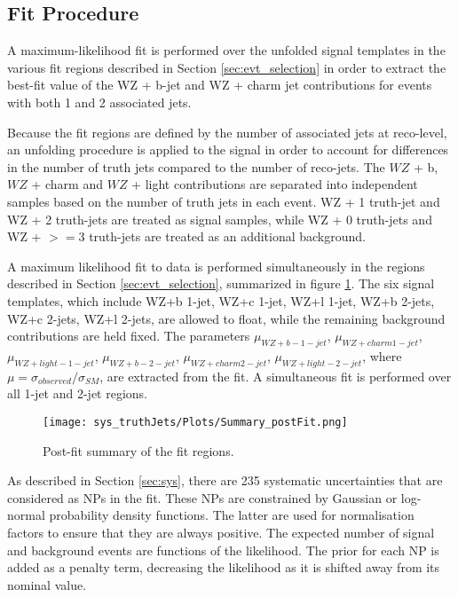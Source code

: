 
\subsection{Fit Procedure}
\label{sec:fit}

A maximum-likelihood fit is performed over the unfolded signal templates in the various fit regions described in Section \ref{sec:evt_selection} in order to extract the best-fit value of the WZ + b-jet and WZ + charm jet contributions for events with both 1 and 2 associated jets.

Because the fit regions are defined by the number of associated jets at reco-level, an unfolding procedure is applied to the signal in order to account for differences in the number of truth jets compared to the number of reco-jets. The $WZ$ + b, $WZ$ + charm and $WZ$ + light contributions are separated into independent samples based on the number of truth jets in each event. WZ + 1 truth-jet and WZ + 2 truth-jets are treated as signal samples, while WZ + 0 truth-jets and WZ + $>=$3 truth-jets are treated as an additional background. 

A maximum likelihood fit to data is performed simultaneously in the regions described in Section \ref{sec:evt_selection}, summarized in figure \ref{fig:summary}. The six signal templates, which include WZ+b 1-jet, WZ+c 1-jet, WZ+l 1-jet, WZ+b 2-jets, WZ+c 2-jets, WZ+l 2-jets, are allowed to float, while the remaining background contributions are held fixed. The parameters $\mu_{WZ+b - 1-jet}$, $\mu_{WZ+charm 1-jet}$, $\mu_{WZ+light - 1-jet}$, $\mu_{WZ+b - 2-jet}$, $\mu_{WZ+charm 2-jet}$, $\mu_{WZ+light - 2-jet}$, where $\mu = \sigma_{observed}/\sigma_{SM} $, are extracted from the fit. A simultaneous fit is performed over all 1-jet and 2-jet regions.

\begin{figure}[H]
  \center                                                                                                                    
  \texttt{[image: sys\_truthJets/Plots/Summary\_postFit.png]}
  \caption{Post-fit summary of the fit regions.}
  \label{fig:summary}
\end{figure}

As described in Section \ref{sec:sys}, there are 235 systematic uncertainties that are considered as NPs in the fit. These NPs are constrained by Gaussian or log-normal probability density functions. The latter are used for normalisation factors to ensure that they are always positive. The expected number of signal and background events are functions of the likelihood. The prior for each NP is added as a penalty term, decreasing the likelihood as it is shifted away from its nominal value. 

